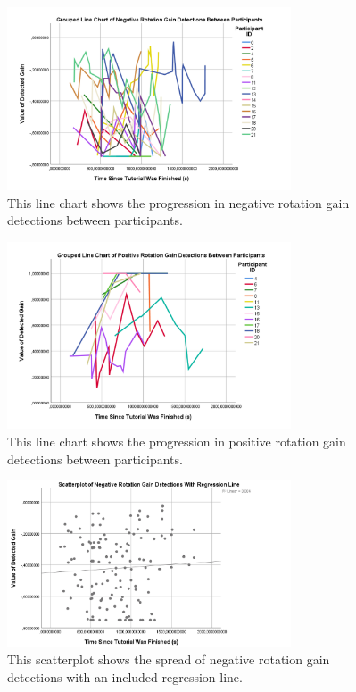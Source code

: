\begin{figure}[tbph]
    \centering
    \includegraphics[width=0.75\textwidth]{figures/graphs/NegativeRotationDetectionsLineChart.png}
    \caption[Line Chart of Negative Rotation Gain Detections Between Participants]{This line chart shows the progression in negative rotation gain detections between participants.}
    \label{fig:negativeRotationDetectionLineChart}
\end{figure}

\begin{figure}[tbph]
    \centering
    \includegraphics[width=0.75\textwidth]{figures/graphs/PositiveRotationDetectionsLineChart.png}
    \caption[Line Chart of Positive Rotation Gain Detections Between Participants]{This line chart shows the progression in positive rotation gain detections between participants.}
    \label{fig:positiveRotationDetectionLineChart}
\end{figure}

\begin{figure}[tbph]
    \centering
    \includegraphics[width=0.75\textwidth]{figures/graphs/NegRotDetectionsRegLine.png}
    \caption[Scatterplot For Negative Rotation Gain Detections Including Regression Line]{This scatterplot shows the spread of negative rotation gain detections with an included regression line.}
    \label{fig:negRotRegLine}
\end{figure}

